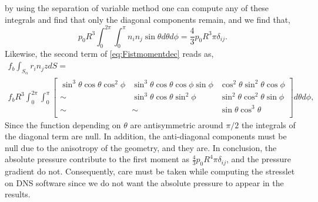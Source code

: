 by using the separation of variable method one can compute any of these integrals and find that only the diagonal components remain, and we find that, 
\begin{equation}
    p_0 R^3 \int_{0}^{2\pi}\int_{0}^\pi n_i n_j \sin\theta d\theta d\phi
    = \frac{4}{3}  p_0 R^3 \pi \delta_{ij}.
\end{equation}
Likewise, the second term of \ref{eq:Fistmomentdec} reads as,
\begin{multline}
    f_b \int_{S_\alpha} r_i n_j z dS
    =\\
     f_b R^3 \int_{0}^{2\pi}\int_{0}^\pi
    \left[
        \begin{matrix}
            \sin^3\theta \cos\theta \cos^2\phi & \sin^3\theta \cos\theta \cos\phi \sin\phi
            &\cos^2\theta\sin^2\theta \cos\phi\\
            \sim& \sin^3\theta \cos\theta \sin^2\phi & \sin^2\theta \cos^2\theta\sin\phi \\
            \sim& \sim & \sin\theta \cos^3\theta \\
        \end{matrix}
    \right]
    d\theta d\phi,
\end{multline}
Since the function depending on $\theta$ are antisymmetric around $\pi/2$ the integrals of the diagonal term are null.
In addition, the anti-diagonal components must be null due to the anisotropy of the geometry, and they are.  
In conclusion, the absolute pressure contribute to the first moment as $ \frac{4}{3}  p_0 R^4 \pi \delta_{ij}$, and the pressure gradient do not. 
Consequently, care must be taken while computing the stresslet on DNS software since we do not want the absolute pressure to appear in the results. 


